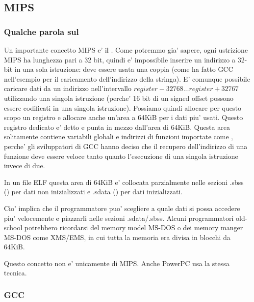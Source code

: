 \subsection{MIPS}

\subsubsection{Qualche parola sul }
\label{MIPS_GP}


Un importante concetto MIPS e' il .
Come potremmo gia' sapere, ogni ustrizione MIPS ha lunghezza pari a 32 bit, quindi e' impossibile inserire un indirizzo a 32-bit
in una sola istruzione: deve essere usata una coppia (come ha fatto GCC nell'esempio per il caricamento dell'indirizzo della stringa).
E' comunque possibile caricare dati da un indirizzo nell'intervallo $register-32768...register+32767$ utilizzando una singola istruzione
(perche' 16 bit di un signed offset possono essere codificati in una singola istruzione).
Possiamo quindi allocare per questo scopo un registro e allocare anche un'area a 64KiB per i dati piu' usati.
Questo registro dedicato e' detto  e punta in mezzo dall'area di 64KiB.
Questa area solitamente contiene variabili globali e indirizzi di funzioni importate come \printf, perche' gli sviluppatori di GCC hanno deciso
che il recupero dell'indirizzo di una funzione deve essere veloce tanto quanto l'esecuzione di una singola istruzione invece di due.

In un file ELF questa area di 64KiB e' collocata parzialmente nelle sezioni .sbss () per dati non inizializzati
e .sdata () per dati inizializzati.

Cio' implica che il programmatore puo' scegliere a quale dati si possa accedere piu' velocemente e piazzarli nelle sezioni .sdata/.sbss.
Alcuni programmatori old-school potrebbero ricordarsi del memory model MS-DOS  
o dei memory manger MS-DOS come XMS/EMS, in cui tutta la memoria era divisa in blocchi da 64KiB.


Questo concetto non e' unicamente di MIPS. Anche PowerPC usa la stessa tecnica.

\subsubsection{\Optimizing GCC}

